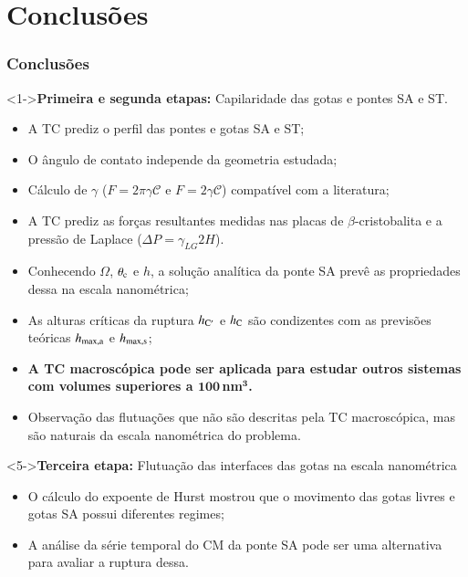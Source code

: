 \documentclass[8pt]{beamer}
\begin{document}
\section{Conclusões}
\begin{frame}
\frametitle{Conclusões}
	\vspace{-0.3cm}
	\begin{block}<1->{{\bf Primeira e segunda etapas:} Capilaridade das gotas e pontes SA e ST.}
 		\begin{itemize}
			\item<2-> A TC prediz o perfil das pontes e gotas SA e ST;
			\item<2-> O ângulo de contato independe da geometria estudada;
			\item<2-> Cálculo de $\gamma$ ($F=2\pi\gamma \mathcal C$ e $F=2\gamma \mathcal C$) compatível com a literatura;
			\item<2-> A TC prediz as forças resultantes medidas nas placas de $\beta$-cristobalita e a pressão de Laplace ($\Delta P = \gamma_{LG}2 H$).
			\item<2-> Conhecendo $\Omega$, $\theta_{\rm c}$ e $h$, a solução analítica da ponte SA prevê as propriedades dessa na escala nanométrica;
			\item<2-> As alturas críticas da ruptura $h_{\rm C'}$ e $h_{\rm C}$ são condizentes com as previsões teóricas $h_{\rm max,a}$ e $h_{\rm max,s}$;			
			\item<3-> \textbf{A TC macroscópica pode ser aplicada para estudar outros sistemas com volumes superiores a $\mathbf{100}$\,nm$\boldsymbol{^3}$.}
			\item<4-> Observação das flutuações que não são descritas pela TC macroscópica, mas são naturais da escala nanométrica do problema.
		\end{itemize}
	\end{block}

	\begin{block}<5->{{\bf Terceira etapa:} Flutuação das interfaces das gotas na escala nanométrica}
 		\begin{itemize}		
			\item<5-> O cálculo do expoente de Hurst mostrou que o movimento das gotas livres e gotas SA possui diferentes regimes; 
			\item<5-> A análise da série temporal do CM da ponte SA pode ser uma alternativa para avaliar a ruptura dessa.
		\end{itemize}			
	\end{block}
\end{frame}
\end{document}
